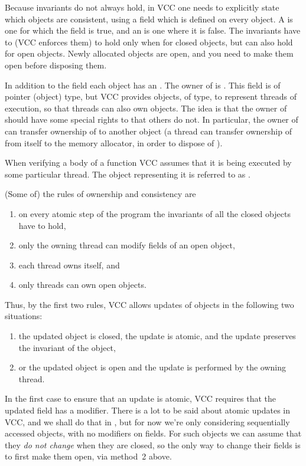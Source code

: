 Because invariants do not always hold,
in VCC one needs to explicitly state which objects are consistent,
using a field \vcc{\closed} which is defined on every object.
A  is one for which the \vcc{\closed} field
is true, and an  is one where it is false.
The invariants have to (VCC enforces them) to hold only when for closed objects, but
can also hold for open objects.
Newly allocated objects are open, and you need to make them open before disposing them.

In addition to the \vcc{\closed} field each object has an .
The owner of  is .
This field is of pointer (object) type, but
VCC provides objects, of \vcc{\thread}
type, to represent threads of execution, so that threads can also own objects.
The idea is that the owner of  should have some special rights to  that others do not.
In particular, the owner of  can transfer ownership of  to
another object (\eg a thread can transfer ownership of  from itself to the memory allocator, 
in order to dispose of ).

When verifying a body of a function VCC assumes that it is being executed by some
particular thread.
The \vcc{\thread} object representing it is referred to as \vcc{\me}.

(Some of) the rules of ownership and consistency are
\begin{enumerate}
\item on every atomic step of the program the invariants of all the closed objects have to hold,
\item only the owning thread can modify fields of an open object,
\item each thread owns itself, and
\item only threads can own open objects.
\end{enumerate}
Thus, by the first two rules, VCC allows updates of objects in the following two situations:
\begin{enumerate}
\item the updated object is closed, the update is atomic, and the update preserves the invariant of the object,
\item or the updated object is open and the update is performed by the owning thread.
\end{enumerate}
In the first case to ensure that an update is atomic, VCC requires that the
updated field has a  modifier.
There is a lot to be said about atomic updates in VCC, and we shall do
that in , but for now we're only considering sequentially
accessed objects, with no  modifiers on fields.
For such objects we can assume that they \emph{do not change}
when they are closed, so the only way to change their fields is to
first make them open, \ie via method~2 above.

